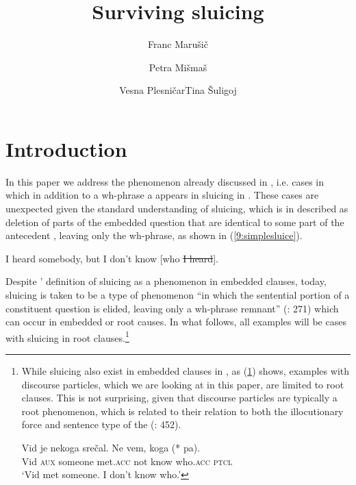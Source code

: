\documentclass[output=paper,modfonts,newtxmath,hidelinks]{langscibook}
\title{Surviving sluicing}
\author{Franc Marušič\affiliation{University of Nova Gorica}\and Petra Mišmaš\affiliation{University of Nova Gorica}\and Vesna Plesničar\affiliation{University of Nova Gorica}\lastand Tina Šuligoj\affiliation{University of Nova Gorica}}
\begin{document}
\maketitle
{}

\section{Introduction}\label{9:s1}
In this paper we address the phenomenon already discussed in \cite{marusicetal2015}, i.e. cases in which in addition to a wh-phrase a  appears in sluicing in . These cases are unexpected given the standard understanding of sluicing, which is in \cite{ross1969} described as deletion of parts of the embedded question that are identical to some part of the antecedent , leaving only the wh-phrase, as shown in (\ref{9:simplesluice}). 


\ea \label{9:simplesluice}I heard somebody, but I don't know [who \sout{I heard}].
\z
 
\noindent Despite \citeauthor{ross1969}' definition of sluicing as a phenomenon in embedded clauses, today, sluicing is taken to be a type of  phenomenon ``in which the sentential portion of a constituent question is elided, leaving only a wh-phrase remnant'' (\citealt{merchant2006}: 271) which can occur in embedded or root causes. In what follows, all  examples will be cases with sluicing in root clauses.\footnote{While sluicing also exist in embedded clauses in , as (\ref{9:embeddedpa}) shows, examples with discourse particles, which we are looking at in this paper, are limited to root clauses. This is not surprising, given that discourse particles are typically a root  phenomenon, which is related to their relation to both the illocutionary force and sentence type of the  (\citealt{bayerobenauer2011}: 452).

\ea \label{9:embeddedpa}
\gll Vid je nekoga srečal. Ne vem, koga (*\hspace{-2pt} pa).\\
Vid \textsc{aux}  someone met.\textsc{acc}  not know who.\textsc{acc} {} \textsc{ptcl}\\
\glt `Vid met someone. I don't know who.'
\zlast }
\end{document}
